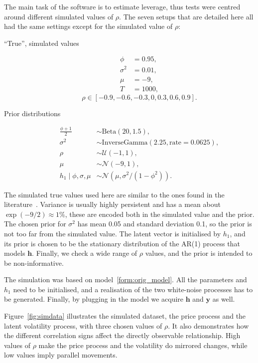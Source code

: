 The main task of the software is to estimate leverage, thus tests were centred around different simulated values of $\rho$.
The seven setups that are detailed here all had the same settings except for the simulated value of $\rho$:
\begin{description}
	\item[``True'', simulated values]
	\begin{align*}
	\phi &= 0.95, \\
	\sigma^2 &= 0.01, \\
	\mu &= -9, \\
	T &= 1000,
	\end{align*}
	\begin{equation*}
	\rho\in[-0.9,-0.6,-0.3,0,0.3,0.6,0.9].
	\end{equation*}
	\item[Prior distributions]
	\begin{align*}
	\frac{\phi+1}2 &\sim\text{Beta}(20,1.5), \\
	\sigma^2 &\sim\text{InverseGamma}(2.25,\text{rate}=0.0625), \\
	\rho &\sim\mathcal{U}(-1,1), \\
	\mu &\sim\mathcal{N}(-9,1), \\
	h_1\mid\phi,\sigma,\mu &\sim\mathcal{N}(\mu,\sigma^2/(1-\phi^2)).
	\end{align*}
\end{description}
The simulated true values used here are similar to the ones found in the literature~\citep{Omori2007,Kastner2014}.
Variance is usually highly persistent and has a mean about $\exp(-9/2)\approx 1\%$, these are encoded both in the simulated value and the prior.
The chosen prior for $\sigma^2$ has mean 0.05 and standard deviation 0.1, so the prior is not too far from the simulated value.
The latent vector is initialised by $h_1$, and its prior is chosen to be the stationary distribution of the AR(1) process that models $\bm h$.
Finally, we check a wide range of $\rho$ values, and the prior is intended to be non-informative.

The simulation was based on model~\ref{form:orig_model}.
All the parameters and $h_1$ need to be initialised, and a realisation of the two white-noise processes has to be generated.
Finally, by plugging in the model we acquire $\bm h$ and $\bm y$ as well.

Figure~\ref{fig:simdata} illustrates the simulated dataset, the price process and the latent volatility process, with three chosen values of $\rho$.
It also demonstrates how the different correlation signs affect the directly observable relationship.
High values of $\rho$ make the price process and the volatility do mirrored changes, while low values imply parallel movements.

